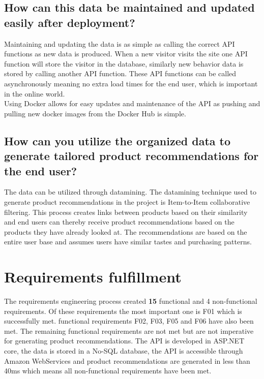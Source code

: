 \subsection{How can this data be maintained and updated easily after deployment?}
Maintaining and updating the data is as simple as calling the correct API functions as new data is produced. When a new visitor visits the site one API function will store the visitor in the database, similarly new behavior data is stored by calling another API function. These API functions can be called asynchronously meaning no extra load times for the end user, which is important in the online world. \\
Using Docker allows for easy updates and maintenance of the API as pushing and pulling new docker images from the Docker Hub is simple.

\subsection{How can you utilize the organized data to generate tailored product recommendations for the end user?}
The data can be utilized through datamining. The datamining technique used to generate product recommendations in the project is Item-to-Item collaborative filtering. This process creates links between products based on their similarity and end users can thereby receive product recommendations based on the products they have already looked at. The recommendations are based on the entire user base and assumes users have similar tastes and purchasing patterns.

\section{Requirements fulfillment}
The requirements engineering process created \textbf{15} functional and 4 non-functional requirements. Of these requirements the most important one is F01 which is successfully met. functional requirements F02, F03, F05 and F06 have also been met. The remaining functional requirements are not met but are not imperative for generating product recommendations. The API is developed in ASP.NET core, the data is stored in a No-SQL database, the API is accessible through Amazon WebServices and product recommendations are generated in less than 40ms which means all non-functional requirements have been met.
